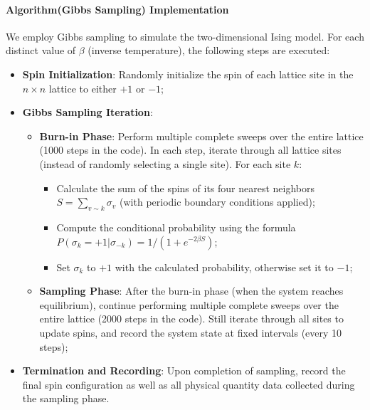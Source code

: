 \documentclass[11pt]{article}
\providecommand{\tightlist}{%
      \setlength{\itemsep}{0pt}\setlength{\parskip}{0pt}}
\begin{document}
\paragraph{Algorithm(Gibbs Sampling)
Implementation}\label{algorithmgibbs-sampling-implementation}

We employ Gibbs sampling to simulate the two-dimensional Ising model.
For each distinct value of \(\beta\) (inverse temperature), the
following steps are executed:

\begin{itemize}
\item
  \textbf{Spin Initialization}: Randomly initialize the spin of each
  lattice site in the \(n \times n\) lattice to either \(+1\) or \(-1\);
\item
  \textbf{Gibbs Sampling Iteration}:

  \begin{itemize}
  \tightlist
  \item
    \textbf{Burn-in Phase}: Perform multiple complete sweeps over the
    entire lattice (1000 steps in the code). In each step, iterate
    through all lattice sites (instead of randomly selecting a single
    site). For each site \(k\):

    \begin{itemize}
    \tightlist
    \item
      Calculate the sum of the spins of its four nearest neighbors
      \(S = \sum_{v\sim k} \sigma_v\) (with periodic boundary conditions
      applied);
    \item
      Compute the conditional probability using the formula
      \(P(\sigma_k = +1|\sigma_{-k}) = 1/(1+e^{-2\beta S})\);
    \item
      Set \(\sigma_k\) to \(+1\) with the calculated probability,
      otherwise set it to \(-1\);
    \end{itemize}
  \item
    \textbf{Sampling Phase}: After the burn-in phase (when the system
    reaches equilibrium), continue performing multiple complete sweeps
    over the entire lattice (2000 steps in the code). Still iterate
    through all sites to update spins, and record the system state at
    fixed intervals (every 10 steps);
  \end{itemize}
\item
  \textbf{Termination and Recording}: Upon completion of sampling,
  record the final spin configuration as well as all physical quantity
  data collected during the sampling phase.
\end{itemize}
\end{document}
